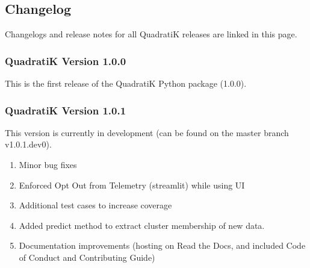 \documentclass[letterpaper,10pt,english,openany,oneside]{sphinxmanual}
\begin{document}
{{{{\sphinxstepscope


\subsection{Changelog}
\label{\detokenize{changelog/index:changelog}}\label{\detokenize{changelog/index::doc}}
\sphinxAtStartPar
Changelogs and release notes for all QuadratiK releases are linked in this page.

\sphinxstepscope


\subsubsection{QuadratiK Version 1.0.0}
\label{\detokenize{changelog/v1.0.0:quadratik-version-1-0-0}}\label{\detokenize{changelog/v1.0.0::doc}}
\sphinxAtStartPar
This is the first release of the QuadratiK Python package (1.0.0).

\sphinxstepscope


\subsubsection{QuadratiK Version 1.0.1}
\label{\detokenize{changelog/v1.0.1:quadratik-version-1-0-1}}\label{\detokenize{changelog/v1.0.1::doc}}
\sphinxAtStartPar
This version is currently in development (can be found on the master branch v1.0.1.dev0).
\begin{description}
\begin{enumerate}
%
\item {} 
\sphinxAtStartPar
Minor bug fixes

\item {} 
\sphinxAtStartPar
Enforced Opt Out from Telemetry (streamlit) while using UI

\item {} 
\sphinxAtStartPar
Additional test cases to increase coverage

\item {} 
\sphinxAtStartPar
\sphinxstylestrong{{[}NEW{]}} Added predict method to extract cluster membership of new data.

\item {} 
\sphinxAtStartPar
Documentation improvements (hosting on Read the Docs, and included Code of Conduct and Contributing Guide)

\end{enumerate}


\end{description}}}}}
\end{document}
